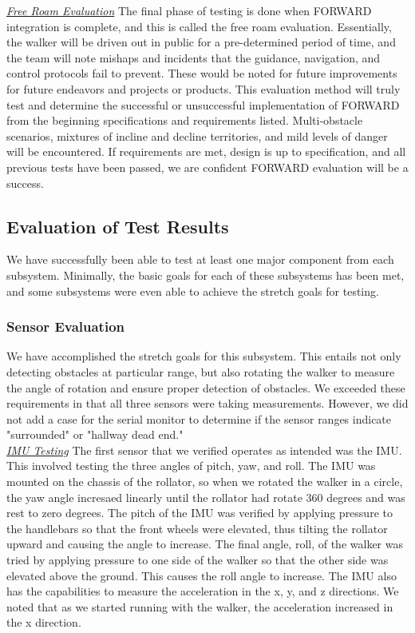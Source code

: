 \noindent \underline{\textit{Free Roam Evaluation}}
\noindent The final phase of testing is done when FORWARD integration is complete, and this is called the free roam evaluation. Essentially, the walker will be driven out in public for a pre-determined period of time, and the team will note mishaps and incidents that the guidance, navigation, and control protocols fail to prevent. These would be noted for future improvements for future endeavors and projects or products. This evaluation method will truly test and determine the successful or unsuccessful implementation of FORWARD from the beginning specifications and requirements listed. Multi-obstacle scenarios, mixtures of incline and decline territories, and mild levels of danger will be encountered. If requirements are met, design is up to specification, and all previous tests have been passed, we are confident FORWARD evaluation will be a success.\\

\subsection{Evaluation of Test Results}
\noindent We have successfully been able to test at least one major component from each subsystem. Minimally, the basic goals for each of these subsystems has been met, and some subsystems were even able to achieve the stretch goals for testing.\\

\subsubsection{Sensor Evaluation}
\noindent We have accomplished the stretch goals for this subsystem. This entails not only detecting obstacles at particular range, but also rotating the walker to measure the angle of rotation and ensure proper detection of obstacles. We exceeded these requirements in that all three sensors were taking measurements. However, we did not add a case for the serial monitor to determine if the sensor ranges indicate "surrounded" or "hallway dead end."\\

\noindent \underline{\textit{IMU Testing}} \noindent The first sensor that we verified operates as intended was the IMU. This involved testing the three angles of pitch, yaw, and roll. The IMU was mounted on the chassis of the rollator, so when we rotated the walker in a circle, the yaw angle incresaed linearly until the rollator had rotate 360 degrees and was rest to zero degrees. The pitch of the IMU was verified by applying pressure to the handlebars so that the front wheels were elevated, thus tilting the rollator upward and causing the angle to increase. The final angle, roll, of the walker was tried by applying pressure to one side of the walker so that the other side was elevated above the ground. This causes the roll angle to increase. The IMU also has the capabilities to measure the acceleration in the x, y, and z directions. We noted that as we started running with the walker, the acceleration increased in the x direction.\\

